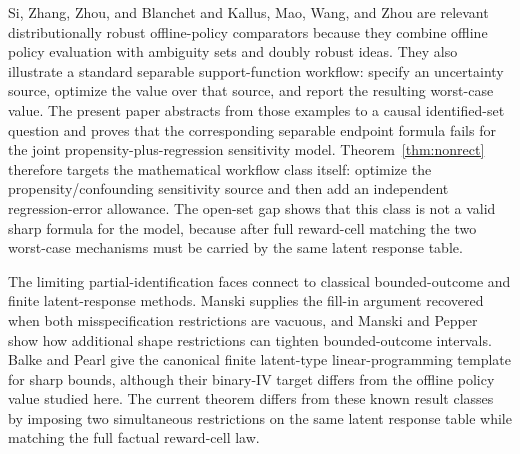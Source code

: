 \documentclass[11pt]{article}
\theoremstyle{definition}
\theoremstyle{plain}
\theoremstyle{remark}
\begin{document}
Si, Zhang, Zhou, and Blanchet \cite{SiZhangZhouBlanchet2020} and Kallus, Mao,
Wang, and Zhou \cite{KallusMaoWangZhou2022} are relevant distributionally robust
offline-policy comparators because they combine offline policy evaluation with
ambiguity sets and doubly robust ideas.  They also illustrate a standard
separable support-function workflow: specify an uncertainty source, optimize
the value over that source, and report the resulting worst-case value.  The
present paper abstracts from those examples to a causal identified-set question
and proves that the corresponding separable endpoint formula fails for the
joint propensity-plus-regression sensitivity model.  Theorem~\ref{thm:nonrect}
therefore targets the mathematical workflow class itself: optimize the
propensity/confounding sensitivity source and then add an independent
regression-error allowance.  The open-set gap shows that this class is not a
valid sharp formula for the model, because after full reward-cell matching the
two worst-case mechanisms must be carried by the same latent response table.

The limiting partial-identification faces connect to classical bounded-outcome
and finite latent-response methods.  Manski \cite{Manski1990} supplies the
fill-in argument recovered when both misspecification restrictions are vacuous,
and Manski and Pepper \cite{ManskiPepper2000} show how additional shape
restrictions can tighten bounded-outcome intervals.  Balke and Pearl
\cite{BalkePearl1997} give the canonical finite latent-type linear-programming
template for sharp bounds, although their binary-IV target differs from the
offline policy value studied here.  The current theorem differs from these
known result classes by imposing two simultaneous restrictions on the same
latent response table while matching the full factual reward-cell law.
\end{document}
